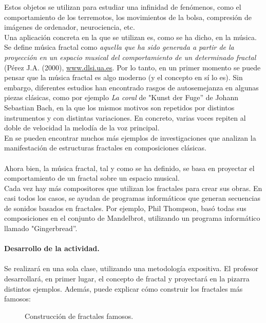 \documentclass[a4paper, openright, 11pt, titlepage]{report}
\theoremstyle{definition}\newtheorem{defin}[propo]{Definition}
\theoremstyle{definition}\newtheorem{obser}[propo]{Remark}
\theoremstyle{definition}\newtheorem{ejem}[propo]{Ejemplo}
\theoremstyle{definition}\newtheorem{algoritmo}[propo]{Algoritmo}
\begin{document}
\begin{itemize}
    Estos objetos se utilizan para estudiar una infinidad de fenómenos, como el comportamiento de los terremotos, los movimientos de la bolsa, compresión de imágenes de ordenador, neurociencia, etc.\\
    Una aplicación concreta en la que se utilizan es, como se ha dicho, en la música. \\
    Se define música fractal como \textit{aquella que ha sido generada a partir de la proyección en un espacio musical del comportamiento de un determinado fractal} \cite{fractales} ({Pérez J.A.} (2000), \url{www.dlsi.ua.es}. Por lo tanto, en un primer momento se puede pensar que la música fractal es algo moderno (y el concepto en sí lo es). Sin embargo, diferentes estudios han encontrado rasgos de autosemejanza en algunas piezas clásicas, como por ejemplo \textit{La coral} de "Kunst der Fuge'' de Johann Sebastian Bach, en la que los mismos motivos son repetidos por distintos instrumentos y con distintas variaciones. En concreto, varias voces repiten al doble de velocidad la melodía de la voz principal.\\
    En \cite{fractales} se pueden encontrar muchos más ejemplos de investigaciones que analizan la manifestación de estructuras fractales en composiciones clásicas.\\\\
    Ahora bien, la música fractal, tal y como se ha definido, se basa en proyectar el comportamiento de un fractal sobre un espacio musical.\\
    Cada vez hay más compositores que utilizan los fractales para crear sus obras. En casi todos los casos, se ayudan de programas informáticos que generan secuencias de sonidos basados en fractales. Por ejemplo, Phil Thompson, basó todas sus composiciones en el conjunto de Mandelbrot, utilizando un programa informático llamado "Gingerbread''.\\\\
    \textbf{Desarrollo de la actividad.}\\\\
    Se realizará en una sola clase, utilizando una metodología expositiva. El profesor desarrollará, en primer lugar, el concepto de fractal y proyectará en la pizarra distintos ejemplos. Además, puede explicar cómo construir los fractales más famosos:
    \begin{figure}[H]
        \centering
         \hspace{1.7cm}
        \caption{Construcción de fractales famosos.}
    \end{figure}
\end{itemize}
\end{document}
